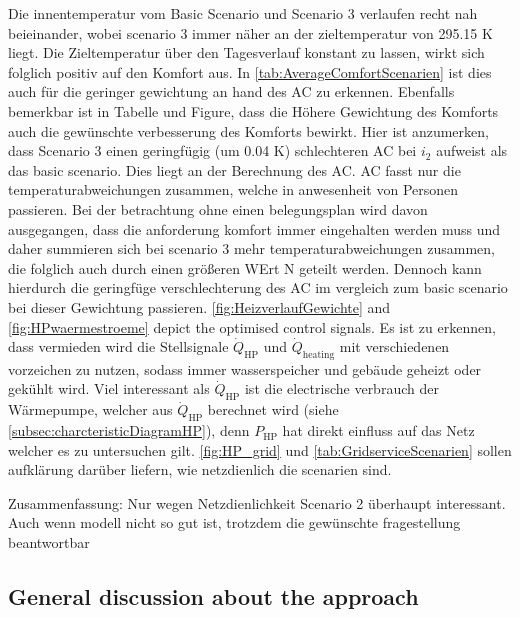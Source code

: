Die innentemperatur vom Basic Scenario und Scenario 3 verlaufen recht nah beieinander, wobei scenario 3 immer näher an der zieltemperatur von 295.15 K liegt. Die Zieltemperatur über den Tagesverlauf konstant zu lassen, wirkt sich folglich positiv auf den Komfort aus. In \autoref{tab:AverageComfortScenarien} ist dies auch für die geringer gewichtung an hand des AC zu erkennen. Ebenfalls bemerkbar ist in Tabelle und Figure, dass die Höhere Gewichtung des Komforts auch die gewünschte verbesserung des Komforts bewirkt. Hier ist anzumerken, dass Scenario 3 einen geringfügig (um 0.04 K) schlechteren AC bei $i_\text{2}$ aufweist als das basic scenario. Dies liegt an der Berechnung des AC. AC fasst nur die temperaturabweichungen zusammen, welche in anwesenheit von Personen passieren. Bei der betrachtung ohne einen belegungsplan wird davon ausgegangen, dass die anforderung komfort immer eingehalten werden muss und daher summieren sich bei scenario 3 mehr temperaturabweichungen zusammen, die folglich auch durch einen größeren WErt N geteilt werden. Dennoch kann hierdurch die geringfüge verschlechterung des AC im vergleich zum basic scenario bei dieser Gewichtung passieren.\newline
\autoref{fig:HeizverlaufGewichte} and \autoref{fig:HPwaermestroeme} depict the optimised control signals. Es ist zu erkennen, dass vermieden wird die Stellsignale $\dot{Q}_\text{HP}$ und $\dot{Q}_\text{heating}$ mit verschiedenen vorzeichen zu nutzen, sodass immer wasserspeicher und gebäude geheizt oder gekühlt wird. Viel interessant als $\dot{Q}_\text{HP}$ ist die electrische verbrauch der Wärmepumpe, welcher aus $\dot{Q}_\text{HP}$ berechnet wird (siehe \autoref{subsec:charcteristicDiagramHP}), denn $P_\text{HP}$ hat direkt einfluss auf das Netz welcher es zu untersuchen gilt. \newline
\autoref{fig:HP_grid} und \autoref{tab:GridserviceScenarien} sollen aufklärung darüber liefern, wie netzdienlich die scenarien sind.
\newline

Zusammenfassung: Nur wegen Netzdienlichkeit Scenario 2 überhaupt interessant. Auch wenn modell nicht so gut ist, trotzdem die gewünschte fragestellung beantwortbar
\subsection{General discussion about the approach}
\label{subsec:General discussion about the approach}

%
